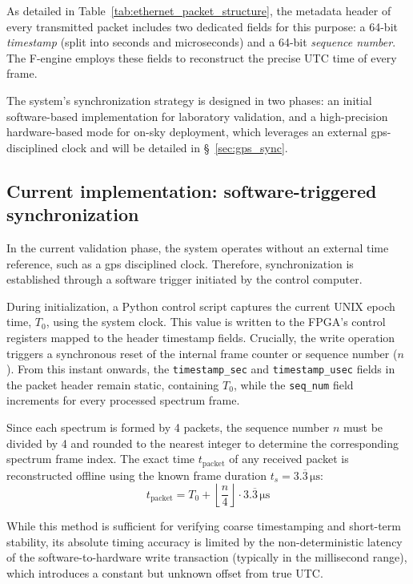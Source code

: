 As detailed in Table~\ref{tab:ethernet_packet_structure}, the metadata header of every transmitted packet includes two dedicated fields for this purpose: a 64-bit \textit{timestamp} (split into seconds and microseconds) and a 64-bit \textit{sequence number}. The F-engine employs these fields to reconstruct the precise UTC time of every frame.

The system's synchronization strategy is designed in two phases: an initial software-based implementation for laboratory validation, and a high-precision hardware-based mode for on-sky deployment, which leverages an external \gls{gps}-disciplined clock and will be detailed in \S~\ref{sec:gps_sync}.

\subsection{Current implementation: software-triggered synchronization}

In the current validation phase, the system operates without an external time reference, such as a \gls{gps} disciplined clock. Therefore, synchronization is established through a software trigger initiated by the control computer.

During initialization, a Python control script captures the current UNIX epoch time, $T_0$, using the system clock. This value is written to the FPGA's control registers mapped to the header timestamp fields. Crucially, the write operation triggers a synchronous reset of the internal frame counter or sequence number ($n$). From this instant onwards, the \texttt{timestamp\_sec} and \texttt{timestamp\_usec} fields in the packet header remain static, containing $T_0$, while the \texttt{seq\_num} field increments for every processed spectrum frame.

Since each spectrum is formed by 4 packets, the sequence number $n$ must be divided by 4 and rounded to the nearest integer to determine the corresponding spectrum frame index. The exact time $t_{\text{packet}}$ of any received packet is reconstructed offline using the known frame duration $t_{s}=3.\overline{3}\,\si{\micro\second}$:
\begin{equation}
	t_{\text{packet}} =  T_0 + \left\lfloor \frac{n}{4} \right\rfloor \cdot 3.\overline{3}\,\si{\micro\second}
\end{equation}

While this method is sufficient for verifying coarse timestamping and short-term stability, its absolute timing accuracy is limited by the non-deterministic latency of the software-to-hardware write transaction (typically in the millisecond range), which introduces a constant but unknown offset from true UTC.

